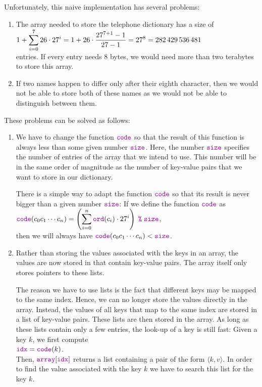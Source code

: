 \noindent
Unfortunately, this naive implementation has several problems: 
\begin{enumerate}
\item The array needed to store the telephone dictionary has a size of 
      \\[0.2cm]
      \hspace*{1.3cm}
      $\displaystyle 1 + \sum\limits_{i=0}^7 26 \cdot 27^i = 1 + 26 \cdot \frac{27^{7+1} - 1}{27 - 1} = 27^8 = 282\,429\,536\,481$ 
      \\[0.2cm]
      entries.  If every entry needs 8 bytes, we would need more than two terabytes to store this array.
\item If two names happen to differ only after their eighth character, then we would not be able to
      store both of these names as we would not be able to distinguish between them.
\end{enumerate}
These problems can be solved as follows:
\begin{enumerate}
\item We have to change the function  $\mytt{code}$ so that the result of this function is always
      less than some given number $\mytt{size}$.  Here, the number $\mytt{size}$ specifies
      the number of entries of the array that we intend to use.  This number will be in the same
      order of magnitude as the number of key-value pairs that we want to store in our dictionary.

      There is a simple way to adapt the function  $\mytt{code}$ so that its result is never bigger
      than a given number $\mytt{size}$: If we define the function $\mytt{code}$ as
      \\[0.2cm]
      \hspace*{1.3cm} 
      $\ds\mytt{code}(c_0c_1\cdots c_n) = \left(\sum\limits_{i=0}^n \mytt{ord}(c_i) \cdot
        27^i\right) \;\mytt{\%}\; \mytt{size}$,
      \\[0.2cm]
      then we will always have $\mytt{code}(c_0c_1\cdots c_n) < \mytt{size}$.  
\item Rather than storing the values associated with the keys in an array, the values are now stored
      in  that contain key-value pairs.  The array itself only stores pointers to these
       lists. 
      
      The reason we have to use lists is the fact that different keys may be mapped to the
      same index.  Hence, we can no longer store the values directly in the array.  Instead,
      the values of all keys that map to the same index are stored in a
      list of key-value pairs.  These  lists are then stored in the array.  As long as
      these lists contain only a few entries, the look-up of a key is still fast: Given a key $k$,
      we first compute 
      \\[0.2cm]
      \hspace*{1.3cm}
      $\mytt{idx} = \mytt{code}(k)$.
      \\[0.2cm]
      Then, $\mytt{array}[\mytt{idx}]$ returns a list containing a pair of the form $\langle k, v \rangle$.
      In order to find the value associated with the key $k$ we have to search this list for the key
      $k$.
\end{enumerate}

